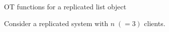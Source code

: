 \begin{frame}{}
  \centerline{\large OT functions for a replicated list object~}

  \resizebox{\textwidth}{!}{
    \begin{minipage}{\textwidth}
      
    \end{minipage}
  }
\end{frame}

\begin{frame}{}
  \centerline{\large Consider a replicated system with $n \; (=3)$ clients.}

\end{frame}
